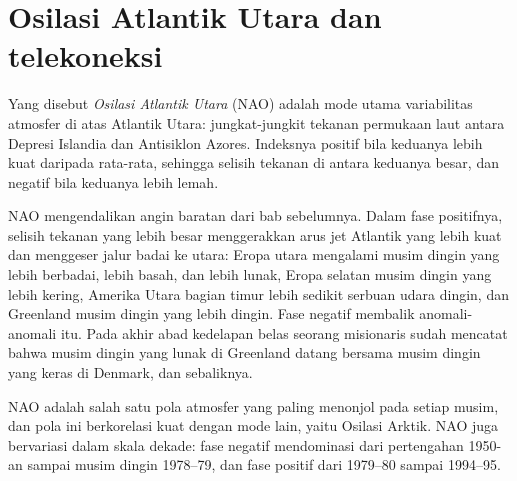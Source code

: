 \section{Osilasi Atlantik Utara dan telekoneksi}\label{sec:b2:climate-variability:nao}

\begin{definition}\label{def:b2:climate-variability:nao}
Yang disebut \emph{Osilasi Atlantik Utara} (NAO) adalah mode utama
variabilitas atmosfer di atas Atlantik Utara: jungkat-jungkit tekanan permukaan laut antara
Depresi Islandia dan Antisiklon Azores. Indeksnya positif bila keduanya lebih kuat daripada rata-rata, sehingga
selisih tekanan di antara keduanya besar, dan negatif bila keduanya lebih lemah.
\end{definition}

NAO mengendalikan angin baratan dari bab sebelumnya. Dalam fase positifnya, selisih tekanan yang lebih besar
menggerakkan arus jet Atlantik yang lebih kuat dan menggeser jalur badai ke utara: Eropa utara
mengalami musim dingin yang lebih berbadai, lebih basah, dan lebih lunak, Eropa selatan musim dingin yang lebih kering, Amerika Utara bagian timur
lebih sedikit serbuan udara dingin, dan Greenland musim dingin yang lebih dingin. Fase negatif membalik anomali-anomali
itu. Pada akhir abad kedelapan belas seorang misionaris sudah mencatat bahwa musim dingin yang lunak di
Greenland datang bersama musim dingin yang keras di Denmark, dan sebaliknya.

NAO adalah salah satu pola atmosfer yang paling menonjol pada setiap musim, dan pola ini
berkorelasi kuat dengan mode lain, yaitu Osilasi Arktik. NAO juga bervariasi dalam skala dekade: fase negatif mendominasi
dari pertengahan 1950-an sampai musim dingin 1978--79, dan fase positif dari 1979--80 sampai 1994--95.

